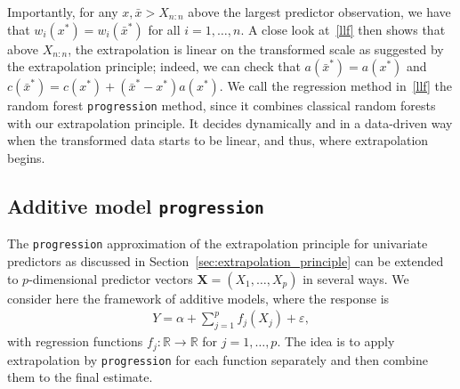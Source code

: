 \documentclass{statsoc}
\theoremstyle{break}
\begin{document}
Importantly, for any $x, \bar x > X_{n:n}$ above the largest predictor observation, we have that $w_i(x^*) = w_i(\bar x^*)$ for all $i=1,\dots,n$. A close look at~\eqref{llf} then shows that above $X_{n:n}$, the extrapolation is linear on the transformed scale as suggested by the extrapolation principle; indeed, we can check that $a(\bar x^*) = a(x^*)$ and $c(\bar x^*) = c(x^*) + (\bar x^* - x^*)a(x^*)$. We call the regression method in~\eqref{llf} the random forest \texttt{progression} method, since it combines classical random forests with our extrapolation principle. It decides dynamically and in a data-driven way when the transformed data starts to be linear, and thus, where extrapolation begins.


\subsection{Additive model \texttt{progression}}\label{add_progression}

The \texttt{progression} approximation of the extrapolation principle for univariate predictors as discussed in Section~\ref{sec:extrapolation_principle} can be extended to $p$-dimensional predictor vectors $\mathbf X = (X_1,\dots, X_p)$ in several ways. We consider here the framework of additive models, where the response is
\begin{align}
	\label{add_model} 
	Y = \alpha + \sum_{j=1}^p f_j(X_j) + \varepsilon,
\end{align}
with regression functions $f_j: \mathbb R \to \mathbb R$ for $j=1,\dots, p$.
The idea is to apply extrapolation by \texttt{progression} for each function separately and then combine them to the final estimate. 
\end{document}
